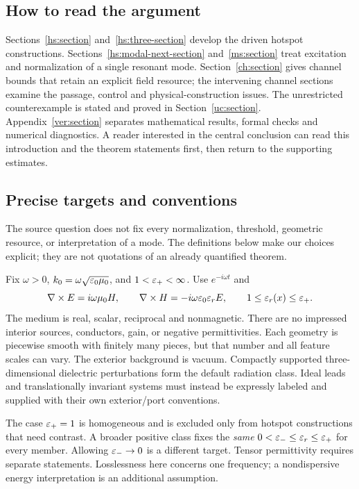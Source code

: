 \subsection{How to read the argument}
Sections~\ref{hs:section} and~\ref{hs:three-section} develop the driven
hotspot constructions.  Sections~\ref{hs:modal-next-section}
and~\ref{ms:section} treat excitation and normalization of a single
resonant mode.  Section~\ref{ch:section} gives channel bounds that retain an
explicit field resource; the intervening channel sections examine the
passage, control and physical-construction issues.  The unrestricted
counterexample is stated and proved in Section~\ref{uc:section}.
Appendix~\ref{ver:section} separates mathematical results, formal checks
and numerical diagnostics.  A reader interested in the central conclusion
can read this introduction and the theorem statements first, then return to
the supporting estimates.

\subsection{Precise targets and conventions}
The source question does not fix every normalization, threshold, geometric
resource, or interpretation of a mode.  The definitions below make our
choices explicit; they are not quotations of an already quantified theorem.

\begin{assumption}\label{pr:class}
Fix $\omega>0$, $k_0=\omega\sqrt{\varepsilon_0\mu_0}$, and $1<\varepsilon_+<\infty$. Use $e^{-i\omega t}$ and
\begin{equation}\label{pr:maxwell}
 \nabla\times E=i\omega\mu_0H,\qquad
 \nabla\times H=-i\omega\varepsilon_0\varepsilon_r E,
 \qquad 1\leq\varepsilon_r(x)\leq\varepsilon_+.
\end{equation}
The medium is real, scalar, reciprocal and nonmagnetic. There are no impressed interior sources, conductors, gain, or negative permittivities. Each geometry is piecewise smooth with finitely many pieces, but that number and all feature scales can vary. The exterior background is vacuum. Compactly supported three-dimensional dielectric perturbations form the default radiation class. Ideal leads and translationally invariant systems must instead be expressly labeled and supplied with their own exterior/port conventions.
\end{assumption}
The case $\varepsilon_+=1$ is homogeneous and is excluded only from hotspot constructions that need contrast. A broader positive class fixes the \emph{same} $0<\varepsilon_-\leq\varepsilon_r\leq\varepsilon_+$ for every member. Allowing $\varepsilon_-\to0$ is a different target. Tensor permittivity requires separate statements. Losslessness here concerns one frequency; a nondispersive energy interpretation is an additional assumption.

